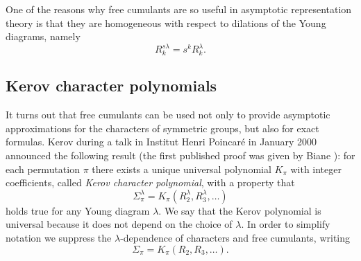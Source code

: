 \documentclass[12pt]{amsart}
\theoremstyle{plain}
\theoremstyle{remark}
\begin{document}
One of the reasons why free cumulants are so useful in asymptotic
representation theory is that they are homogeneous with respect to dilations of
the Young diagrams, namely
$$ R^{s\lambda}_k = s^k R^{\lambda}_k.$$




\subsection{Kerov character polynomials}
It turns out that free cumulants can be used not only to provide asymptotic
approximations for the characters of symmetric groups, but also for exact
formulas. Kerov during a talk in Institut Henri Poincar\'e in January 2000
\cite{Kerov2000talk} announced the following result (the first published proof
was given by Biane \cite{Biane2003}): for each permutation $\pi$ there exists a
unique universal polynomial $K_{\pi}$ with integer coefficients, called
\emph{Kerov character polynomial}, with a property that
$$\Sigma^{\lambda}_\pi =
K_{\pi}(R_2^{\lambda},R_3^\lambda,\dots)$$
holds true for any
Young diagram $\lambda$.
We say that the Kerov polynomial is universal because it does not depend on the
choice of $\lambda$. In order to simplify notation we suppress the
$\lambda$-dependence of characters and free cumulants, writing
$$ \Sigma_\pi = K_{\pi}(R_2,R_3,\dots).$$
\end{document}

